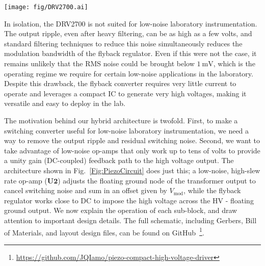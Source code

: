 \documentclass[aip,rsi,reprint]{revtex4-1} %
\begin{document}
\begin{figure*}[t]
\texttt{[image: fig/DRV2700.ai]}
\caption{Schematic of the high voltage stabilization.
The voltage HV is generated using a Texas Instruments DRV2700 high voltage driver in flyback configuration (see Fig.~\ref{Fig:DRV2700}).
A fast, very high slew-rate op-amp senses the output voltage across $R_1$ and $R_2$, and servos it by modulating the node at ``HV floating gnd''.
The $V_{\text{DC}}$ gain is set by $\left(1+R_1/R_2\right)$, while the modulation gain is set by $-R_{\text{mod}}/R_{\text{fb}}$.
The capacitor linking the floating ground node to the output allows the op-amp to remove residual switching noise and stabilize the DC output according to the transfer function given in Eq.~(\ref{Eq:PiezoTransfer}). \label{Fig:PiezoCircuit}}
\end{figure*}

In isolation, the DRV2700 is not suited for low-noise laboratory instrumentation. 
The output ripple, even after heavy filtering, can be as high as a few volts, and standard filtering techniques to reduce this noise simultaneously reduces the modulation bandwidth of the flyback regulator.
Even if this were not the case, it remains unlikely that the RMS noise could be brought below $\SI{1}{\milli\volt}$, which is the operating regime we require for certain low-noise applications in the laboratory.
Despite this drawback, the flyback converter requires very little current to operate and leverages a compact IC to generate very high voltages, making it versatile and easy to deploy in the lab.

The motivation behind our hybrid architecture is twofold.
First, to make a switching converter useful for low-noise laboratory instrumentation, we need a way to remove the output ripple and residual switching noise.
Second, we want to take advantage of low-noise op-amps that only work up to tens of volts to provide a unity gain (DC-coupled) feedback path to the high voltage output.
The architecture shown in Fig.~\ref{Fig:PiezoCircuit} does just this; a low-noise, high-slew rate op-amp ($\mathbf{U2}$) adjusts the floating ground node of the transformer output to cancel switching noise and sum in an offset given by $V_{\text{mod}}$, while the flyback regulator works close to DC to impose the high voltage across the HV - floating ground output.
We now explain the operation of each sub-block, and draw attention to important design details. 
The full schematic, including Gerbers, Bill of Materials, and layout design files, can be found on GitHub~\footnote{\protect\url{https://github.com/JQIamo/piezo-compact-high-voltage-driver}}.
\end{document}
